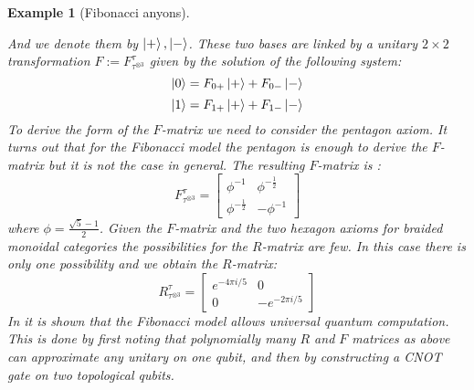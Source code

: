 \documentclass{article}
\newtheorem{example}{Example}
\begin{document}
\begin{example}[Fibonacci anyons]
\begin{center}
		\quad
	\end{center}
	And we denote them by $\ket{+}, \ket{-}$. These two bases are linked by a unitary $2 \times 2$ transformation $F:= F^\tau_{\tau^{\otimes 3}}$ given by the solution of the following system:
	$$ \ket{0} = F_{0+} \ket{+} + F_{0-} \ket{-}$$
	$$ \ket{1} = F_{1+} \ket{+} + F_{1-} \ket{-}$$
	To derive the form of the $F$-matrix we need to consider the pentagon axiom. It turns out that for the Fibonacci model the pentagon is enough to derive the $F$-matrix but it is not the case in general. The resulting $F$-matrix is \cite{Simon16}:
	\begin{equation}
		 F^\tau_{\tau^{\otimes 3}} =
		\begin{bmatrix}
		\phi^{-1} & \phi^{-\frac{1}{2}} \\
		\phi^{-\frac{1}{2}} & -\phi^{-1}
		\end{bmatrix}
	\end{equation}
	where $\phi = \frac{\sqrt{5}-1}{2}$. Given the $F$-matrix and the two hexagon axioms for braided monoidal categories the possibilities for the $R$-matrix are few. In this case there is only one possibility and we obtain the $R$-matrix:
	\begin{equation}
		R^\tau_{\tau^{\otimes 3}} = 
		\begin{bmatrix}
		e^{-4\pi i/ 5} & 0 \\
		0 & -e^{-2\pi i/ 5} 
		\end{bmatrix}
	\end{equation}
	In \cite{Panangaden11} it is shown that the Fibonacci model allows universal quantum computation. This is done by first noting that polynomially many $R$ and $F$ matrices as above can approximate any unitary on one qubit, and then by constructing a CNOT gate on two topological qubits.
\end{example}
\end{document}
